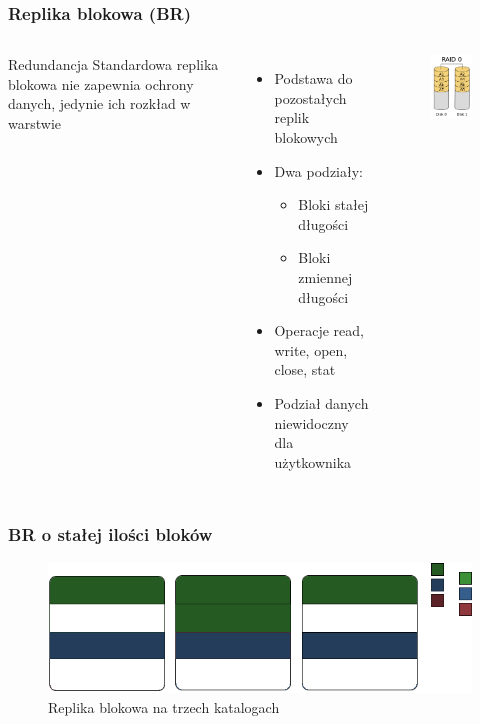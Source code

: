 \documentclass{beamer}
\begin{document}
\begin{frame}
        \frametitle{Replika blokowa (BR)}
		\begin{columns}
		\begin{block}{Redundancja}
			Standardowa replika blokowa nie zapewnia ochrony danych, jedynie ich rozkład w warstwie
		\end{block}
		\begin{itemize}
			\item Podstawa do pozostałych replik blokowych
			\item Dwa podziały:
			\begin{itemize}
				\item Bloki stałej długości
				\item Bloki zmiennej długości
			\end{itemize}
			\item Operacje read, write, open, close, stat

			\item Podział danych niewidoczny dla użytkownika
		\end{itemize}
		\begin{figure}
			\includegraphics[scale=0.5]{raid-0.png}
		\end{figure}
		\end{columns}
\end{frame}

\begin{frame}
    \frametitle{BR o stałej ilości bloków}
    \begin{figure}[h!]
            \centering
            \includegraphics[scale=0.6]{BR-1.png}
            \caption{Replika blokowa na trzech katalogach}
            \label{fig:br1}
    \end{figure}
\end{frame}
\end{document}
